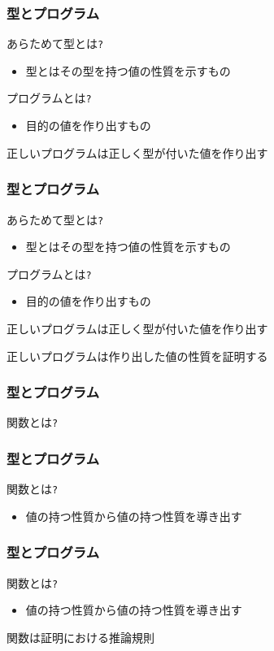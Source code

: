 \documentclass[cjk,dvipdfm,14pt]{beamer}
\begin{document}
\begin{frame}[fragile]
\frametitle{型とプログラム}

あらためて型とは\verb|?|
\begin{itemize}
\item 型とはその型を持つ値の性質を示すもの
\end{itemize}

プログラムとは\verb|?|
\begin{itemize}
\item 目的の値を作り出すもの
\end{itemize}

{ \color{red} 正しいプログラムは正しく型が付いた値を作り出す }

\end{frame}

\begin{frame}[fragile]
\frametitle{型とプログラム}

あらためて型とは\verb|?|
\begin{itemize}
\item 型とはその型を持つ値の性質を示すもの
\end{itemize}

プログラムとは\verb|?|
\begin{itemize}
\item 目的の値を作り出すもの
\end{itemize}

正しいプログラムは正しく型が付いた値を作り出す

{ \color{red} 正しいプログラムは作り出した値の性質を証明する }

\end{frame}

\begin{frame}[fragile]
\frametitle{型とプログラム}

関数とは\verb|?|

\end{frame}

\begin{frame}[fragile]
\frametitle{型とプログラム}

関数とは\verb|?|
\begin{itemize}
\item { \color{red} 値の持つ性質から値の持つ性質を導き出す}
\end{itemize}

\end{frame}

\begin{frame}[fragile]
\frametitle{型とプログラム}

関数とは\verb|?|
\begin{itemize}
\item 値の持つ性質から値の持つ性質を導き出す
\end{itemize}

{ \color{red} 関数は証明における推論規則 }

\end{frame}
\end{document}
